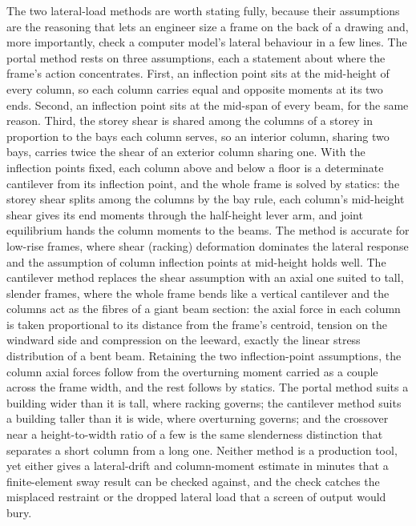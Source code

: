 The two lateral-load methods are worth stating fully, because their
assumptions are the reasoning that lets an engineer size a frame on the
back of a drawing and, more importantly, check a computer model's lateral
behaviour in a few lines. The portal method rests on three assumptions,
each a statement about where the frame's action concentrates. First, an
inflection point sits at the mid-height of every column, so each column
carries equal and opposite moments at its two ends. Second, an inflection
point sits at the mid-span of every beam, for the same reason. Third, the
storey shear is shared among the columns of a storey in proportion to the
bays each column serves, so an interior column, sharing two bays, carries
twice the shear of an exterior column sharing one. With the inflection
points fixed, each column above and below a floor is a determinate
cantilever from its inflection point, and the whole frame is solved by
statics: the storey shear splits among the columns by the bay rule, each
column's mid-height shear gives its end moments through the half-height
lever arm, and joint equilibrium hands the column moments to the beams. The
method is accurate for low-rise frames, where shear (racking) deformation
dominates the lateral response and the assumption of column inflection
points at mid-height holds well. The cantilever method replaces the shear
assumption with an axial one suited to tall, slender frames, where the
whole frame bends like a vertical cantilever and the columns act as the
fibres of a giant beam section: the axial force in each column is taken
proportional to its distance from the frame's centroid, tension on the
windward side and compression on the leeward, exactly the linear
stress distribution of a bent beam. Retaining the two inflection-point
assumptions, the column axial forces follow from the overturning moment
carried as a couple across the frame width, and the rest follows by
statics. The portal method suits a building wider than it is tall, where
racking governs; the cantilever method suits a building taller than it is
wide, where overturning governs; and the crossover near a height-to-width
ratio of a few is the same slenderness distinction that separates a short
column from a long one. Neither method is a production tool, yet either
gives a lateral-drift and column-moment estimate in minutes that a
finite-element sway result can be checked against, and the check catches
the misplaced restraint or the dropped lateral load that a screen of
output would bury.

